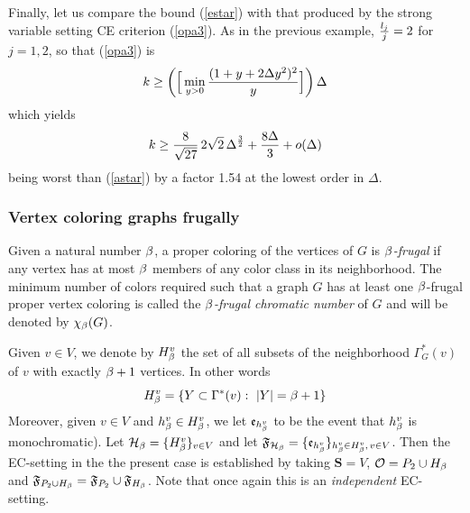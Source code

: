 \documentclass[11pt]{article}
\let\D=\Delta \let\F=\Phi \let\G=\Gamma \let\L=\Lambda \let\Th=\Theta
\let\\=\noindent
\def\ee{\end{equation}}
\def\be{\begin{equation}}
\begin{document}
\\Finally, let us compare the bound (\ref{estar}) with that produced by the strong variable setting
CE criterion (\ref{opa3}). As in the previous example, ${l_j\over j}=2$ for $j=1,2$, so that  (\ref{opa3}) is
\be\label{clstar}
{k}\ge \left(\Big[\min_{y>0}{(1+y+ 2\D y^2)^2\over y}\Big]\right)\D
\ee
which yields
$$
k\ge {8\over\sqrt{27}}\,2\sqrt{2}\,{\D^{3\over 2}} +{8\D\over 3}+ o(\D)
$$
being worst  than  (\ref{astar}) by a factor 1.54 at the lowest order in $\D$.

\subsubsection{\bf Vertex coloring graphs frugally}
Given a natural number $\beta$,
a proper coloring of the vertices of $G$ is  {\it $\beta$-frugal} if any vertex has at most
$\beta$  members of any color class in its neighborhood.
The minimum number of colors required such that a graph $G$ has
at least one $\beta$-frugal proper vertex coloring is called the {\it $\beta$-frugal chromatic number} of $G$ and
will be denoted by $\chi_\beta(G)$.


\\Given $v\in V$, we denote by
$H_{\beta}^v$ the set of all subsets of the neighborhood $\G_G^*(v)$ of $v$ with exactly $\beta+1$ vertices. In other words
$$
H_\b^v=\{Y\subset \G^*(v): ~|Y|=\b+1\}
$$
Moreover, given $v\in V$ and $h_\beta^v\in H_\beta^v$, we let ${\mathfrak{e}}_{h_\beta^v}$ to be the event that
$h_\beta^v$ is monochromatic).
Let ${\cal H}_\beta=\{H_\beta^v\}_{v\in V}$ and let ${\mathfrak{F}}_{{\cal H}_\beta}=\{{\mathfrak{e}}_{h_\beta^v}\}_{h_\beta^v\in H_\beta^v,\,v\in V}$. Then
the EC-setting in the the present case  is established by taking $\mathbf{S}=V$, ${{\mathcal O}}=P_2\cup H_\beta$
and ${\mathfrak{F}}_{P_2\cup H_\beta}={\mathfrak{F}}_{P_2}\cup{\mathfrak{F}}_{H_\beta}$. Note that once again  this is an {\it independent}
EC-setting.
\end{document}
